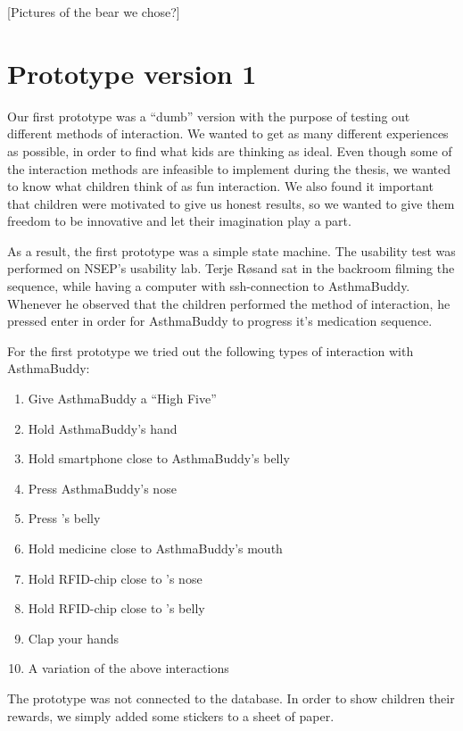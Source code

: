 [Pictures of the bear we chose?]
 
 

 
\section{Prototype version 1}
\label{sec:proto1}
Our first prototype was a ``dumb'' version with the purpose of testing out different methods of interaction. We wanted to get as many different experiences as possible, in order to find what kids are thinking as ideal. Even though some of the interaction methods are infeasible to implement during the thesis, we wanted to know what children think of as fun interaction. We also found it important that children were motivated to give us honest results, so we wanted to give them freedom to be innovative and let their imagination play a part.  

As a result, the first prototype was a simple state machine. The usability test was performed on NSEP's usability lab. Terje R\o sand sat in the backroom filming the sequence, while having a computer with ssh-connection to AsthmaBuddy. Whenever he observed that the children performed the method of interaction, he pressed enter in order for AsthmaBuddy to progress it's medication sequence. 
 
For the first prototype we tried out the following types of interaction with AsthmaBuddy:
\begin{enumerate}
	\item{Give AsthmaBuddy a ``High Five''}
	\item{Hold AsthmaBuddy's hand}
	\item{Hold smartphone close to AsthmaBuddy's belly}
	\item{Press AsthmaBuddy's nose}
	\item{Press \buddy{}'s belly}
	\item{Hold medicine close to AsthmaBuddy's mouth}
	\item{Hold RFID-chip close to \buddy{}'s nose}
	\item{Hold RFID-chip close to \buddy{}'s belly}
	\item{Clap your hands}
	\item{A variation of the above interactions}
\end{enumerate}

The prototype was not connected to the database. In order to show children their rewards, we simply added some stickers to a sheet of paper. 



